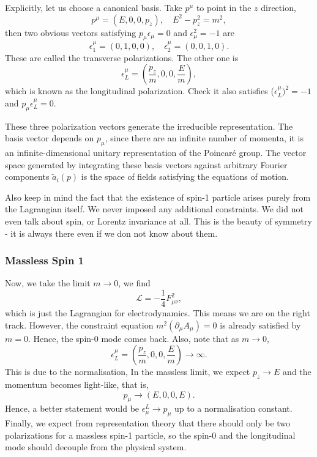 \documentclass[11pt]{article}
\theoremstyle{definition}
\begin{document}
Explicitly, let us choose a canonical basis. Take $p^\mu$ to point in the $z$ direction,
\begin{equation}
    p^\mu = (E, 0, 0, p_z), \quad E^2 - p_z^2 = m^2,
\end{equation}
then two obvious vectors satisfying $p_\mu \epsilon_\mu = 0$ and $\epsilon_\mu^2 = -1$ are
\begin{equation}
    \epsilon^\mu_1 = (0,1,0,0), \quad \epsilon^\mu_2 = (0,0,1,0).
\end{equation}
These are called the transverse polarizations. The other one is 
\begin{equation}
    \epsilon^\mu_L = (\frac{p_z}{m},0,0,\frac{E}{m}),
\end{equation}
which is known as the longitudinal polarization. Check it also satisfies ($\epsilon^\mu_L)^2 = -1$ and $p_\mu\epsilon^\mu_L = 0$. 

These three polarization vectors generate the irreducible representation. The basis vector depends on $p_\mu$, since there are an infinite number of momenta, it is an infinite-dimensional unitary representation of the Poincaré group. The vector space generated by integrating these basis vectors against arbitrary Fourier components $\tilde{a}_i(p)$ is the space of fields satisfying the equations of motion.

Also keep in mind the fact that the existence of spin-1 particle arises purely from the Lagrangian itself. We never imposed any additional constraints. We did not even talk about spin, or Lorentz invariance at all. This is the beauty of symmetry - it is always there even if we don not know about them.

\subsubsection{Massless Spin 1}
Now, we take the limit $m\rightarrow 0$, we find
\begin{equation}
    \mathcal{L} = -\frac{1}{4}F_{\mu\nu}^2,
\end{equation}
which is just the Lagrangian for electrodynamics. This means we are on the right track. However, the constraint equation $m^2(\partial_\mu A_\mu) = 0$ is already satisfied by $m=0$. Hence, the spin-0 mode comes back. Also, note that as $m\rightarrow0$,
\begin{equation}
    \epsilon^\mu_L = (\frac{p_z}{m},0,0,\frac{E}{m}) \rightarrow \infty.
\end{equation}
This is due to the normalisation, In the massless limit, we expect $p_z \rightarrow E$ and the momentum becomes light-like, that is,
\begin{equation}
    p_\mu \rightarrow (E, 0, 0, E).
\end{equation}
Hence, a better statement would be $\epsilon_\mu^L \rightarrow p_\mu$ up to a normalisation constant. Finally, we expect from representation theory that there should only be two polarizations for a massless spin-1 particle, so the spin-0 and the longitudinal mode should decouple from the physical system.
\end{document}
